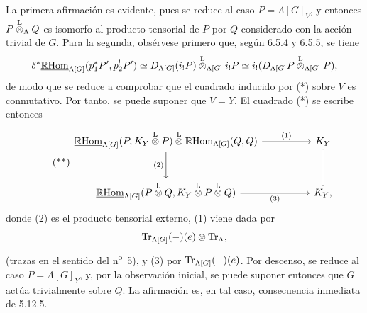 La primera afirmación es evidente, pues se reduce al caso $P=\Lambda[G]_V$, y entonces $P\overset{\mathrm L}{\otimes}_{\Lambda}Q$ es isomorfo al producto tensorial de $P$ por $Q$ considerado con la acción trivial de $G$. Para la segunda, obsérvese primero que, según 6.5.4 y 6.5.5, se tiene
\[
\delta^*\underline{\mathbb{R}\mathrm{Hom}}_{\Lambda[G]}(p_1^*P',p_2^!P')
\simeq
D_{\Lambda[G]}(i_!P)\overset{\mathrm L}{\otimes}_{\Lambda[G]} i_!P
\simeq
i_!(D_{\Lambda[G]}P\overset{\mathrm L}{\otimes}_{\Lambda[G]}P),
\]
de modo que se reduce a comprobar que el cuadrado inducido por (*) sobre $V$ es conmutativo. Por tanto, se puede suponer que $V=Y$. El cuadrado (*) se escribe entonces
\begin{equation}
\tag{**}
\begin{tikzcd}[column sep=huge,row sep=large]
\uRHom_{\Lambda[G]}(P,K_Y\lten P)\lten\RHom_{\Lambda[G]}(Q,Q)
  \arrow[r,"(1)"] \arrow[d,"(2)"']
& K_Y \arrow[d,equal]\\
\uRHom_{\Lambda[G]}(P\lten Q,K_Y\lten P\lten Q) \arrow[r,"(3)"']
& K_Y ,
\end{tikzcd}
\end{equation}
donde (2) es el producto tensorial externo, (1) viene dada por
\[
\operatorname{Tr}_{\Lambda[G]}(-)(e)\otimes\operatorname{Tr}_{\Lambda},
\]
(trazas en el sentido del n\textsuperscript{o}~5), y (3) por $\operatorname{Tr}_{\Lambda[G]}(-)(e)$. Por descenso, se reduce al caso $P=\Lambda[G]_Y$, y, por la observación inicial, se puede suponer entonces que $G$ actúa trivialmente sobre $Q$. La afirmación es, en tal caso, consecuencia inmediata de 5.12.5.
